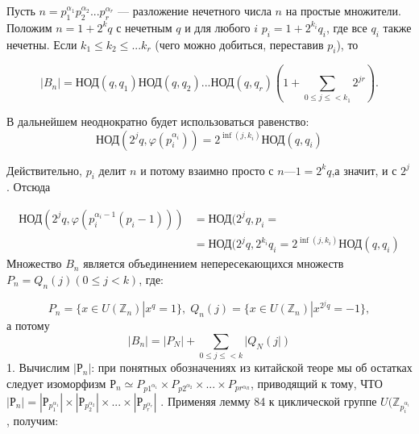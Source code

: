 	\begin{lemma}
	\noindent
	
	Пусть $n = p_{1}^{\alpha_{1}}p_{2}^{\alpha_{2}} ...p_{r}^{\alpha_{r}}$ 	— разложение нечетного числа $n$ на про­стые множители. Положим $n = 1 + 2^kq$ с нечетным $q$ и для любого $i$ $p_i = 1 + 2^{k_{i}}q_i$, где все $q_i$ также нечетны. Если $k_1 \leqslant	k_2 \leqslant ...	k_r$	(чего
	можно добиться, переставив $p_i$), то

	\end{lemma}	

	\begin{equation}
		|B_n| = \text{НОД}(q,q_1)\text{НОД}(q,q_2)...\text{НОД}(q,q_r)(1+\sum_{0\leqslant j \leqslant < k_1} 2^{jr}).
	\end{equation}
	
	\begin{myproof}
	В дальнейшем неоднократно будет использоваться равенство: 
	\begin{equation}
	\text{НОД}(2^jq,\varphi(p_{i}^{\alpha_i}))=2^{\inf(j,k_i)}\text{НОД}(q,q_i)
	\end{equation}
	
	
	
	\noindent
	Действительно, $p_i$ делит $n$ и потому взаимно просто с $n — 1 = 2^kq$,а значит, и с $2^j$	. Отсюда
	
	\begin{equation}
	\begin{split}
	\text{НОД}(2^jq,\varphi(p_{i}^{\alpha_i-1}(p_i-1))) & = \text{НОД}(2^jq,p_{i} = \\ & = \text{НОД}(2^jq,2^{k_{i}}q_i = 2^{\inf(j,k_i)}\text{НОД}(q,q_i)
	\end{split}
	\end{equation}
	Множество $B_n$	является объединением непересекающихся множеств $P_n = Q_n(j)(0 \leqslant j<k)$, где:
	
	\begin{equation}
	P_n = \{x \in U(\mathbb Z_n) | x^q= 1 \}, \; Q_n(j) = \{x \in U(\mathbb Z_n) | x^{2^{j}q}= -1 \},
	\end{equation}
	а потому
	\begin{equation}
	|B_n| = |P_N|+\sum_{0\leqslant j \leqslant < k} |Q_N(j|)
	\end{equation}
	1. Вычислим $|Р_n|$: при понятных обозначениях из китайской теоре	мы об остатках следует изоморфизм $Р_n \simeq P_{p{1}^{\alpha_1}} \times P_{p{2}^{\alpha_2}} \times ... \times P_{p{r}^{\alpha_R}}$,
	приводящий к тому, ЧТО $|Р_n| = |Р_{p^{\alpha_{1}}_1}| \times |Р_{p^{\alpha_{2}}_2}| \times ... \times |Р_{p^{\alpha_{r}}_r}|$ . Применяя
	лемму 84 к  циклической группе $U(\mathbb Z_{p_{i}^{\alpha_i}}$, получим:


\end{myproof}
